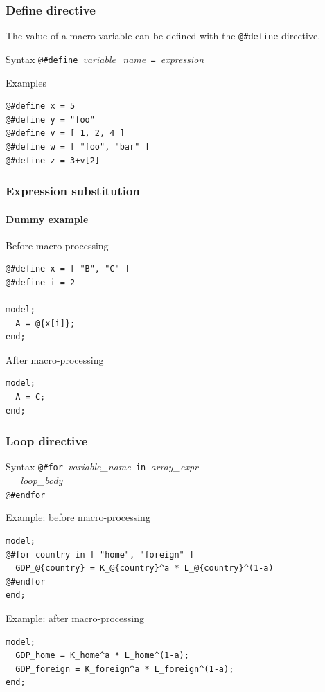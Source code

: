 \documentclass{beamer}
\begin{document}
\begin{frame}[fragile=singleslide]
  \frametitle{Define directive}

  The value of a macro-variable can be defined with the \verb+@#define+ directive.

  \begin{block}{Syntax}
    \verb+@#define +\textit{variable\_name}\verb+ = +\textit{expression}
  \end{block}

  \begin{block}{Examples}
\begin{verbatim}
@#define x = 5
@#define y = "foo"
@#define v = [ 1, 2, 4 ]
@#define w = [ "foo", "bar" ]
@#define z = 3+v[2]
\end{verbatim}
  \end{block}
\end{frame}

\begin{frame}[fragile=singleslide]
  \frametitle{Expression substitution}
  \framesubtitle{Dummy example}
  \begin{block}{Before macro-processing}
\begin{verbatim}
@#define x = [ "B", "C" ]
@#define i = 2

model;
  A = @{x[i]};
end;
\end{verbatim}
  \end{block}
  \begin{block}{After macro-processing}
\begin{verbatim}
model;
  A = C;
end;
\end{verbatim}
  \end{block}
\end{frame}

\begin{frame}[fragile=singleslide]
  \frametitle{Loop directive}
  \begin{block}{Syntax}
\verb+@#for +\textit{variable\_name}\verb+ in +\textit{array\_expr} \\
\verb+   +\textit{loop\_body} \\
\verb+@#endfor+
  \end{block}
  \begin{block}{Example: before macro-processing}
    \small
\begin{verbatim}
model;
@#for country in [ "home", "foreign" ]
  GDP_@{country} = K_@{country}^a * L_@{country}^(1-a)
@#endfor
end;
\end{verbatim}
    \normalsize
  \end{block}

  \begin{block}{Example: after macro-processing}
    \small
\begin{verbatim}
model;
  GDP_home = K_home^a * L_home^(1-a);
  GDP_foreign = K_foreign^a * L_foreign^(1-a);
end;
\end{verbatim}
    \normalsize
  \end{block}
\end{frame}
\end{document}
